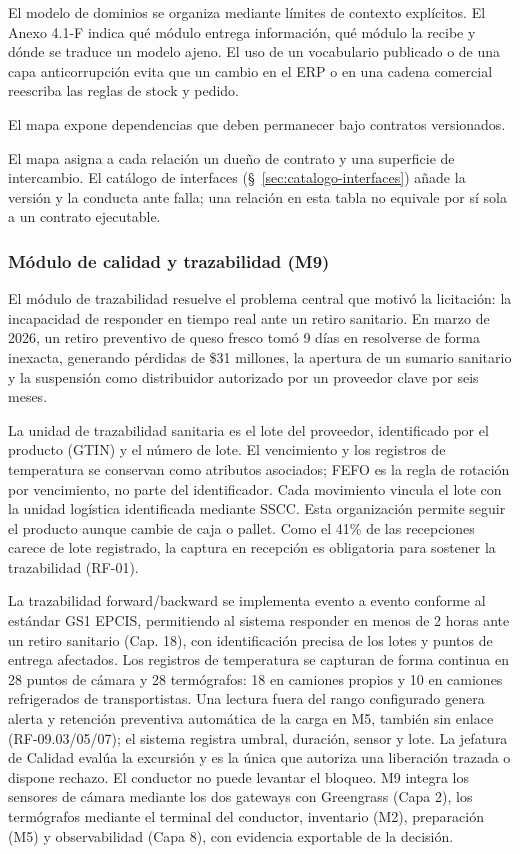 El modelo de dominios se organiza mediante límites de contexto explícitos. El Anexo 4.1-F indica qué módulo entrega información, qué módulo la recibe y dónde se traduce un modelo ajeno. El uso de un vocabulario publicado o de una capa anticorrupción evita que un cambio en el ERP o en una cadena comercial reescriba las reglas de stock y pedido.


El mapa expone dependencias que deben permanecer bajo contratos versionados.

El mapa asigna a cada relación un dueño de contrato y una superficie de intercambio. El catálogo de interfaces (\S~\ref{sec:catalogo-interfaces}) añade la versión y la conducta ante falla; una relación en esta tabla no equivale por sí sola a un contrato ejecutable.

\subsubsection{Módulo de calidad y trazabilidad (M9)}

El módulo de trazabilidad resuelve el problema central que motivó la licitación: la incapacidad de responder en tiempo real ante un retiro sanitario. En marzo de 2026, un retiro preventivo de queso fresco tomó 9 días en resolverse de forma inexacta, generando pérdidas de \$31 millones, la apertura de un sumario sanitario y la suspensión como distribuidor autorizado por un proveedor clave por seis meses.

La unidad de trazabilidad sanitaria es el lote del proveedor, identificado por el producto (GTIN) y el número de lote. El vencimiento y los registros de temperatura se conservan como atributos asociados; FEFO es la regla de rotación por vencimiento, no parte del identificador. Cada movimiento vincula el lote con la unidad logística identificada mediante SSCC. Esta organización permite seguir el producto aunque cambie de caja o pallet. Como el 41\% de las recepciones carece de lote registrado, la captura en recepción es obligatoria para sostener la trazabilidad (RF-01).

La trazabilidad forward/backward se implementa evento a evento conforme al estándar GS1 EPCIS, permitiendo al sistema responder en menos de 2 horas ante un retiro sanitario (Cap. 18), con identificación precisa de los lotes y puntos de entrega afectados. Los registros de temperatura se capturan de forma continua en 28 puntos de cámara y 28 termógrafos: 18 en camiones propios y 10 en camiones refrigerados de transportistas. Una lectura fuera del rango configurado genera alerta y retención preventiva automática de la carga en M5, también sin enlace (RF-09.03/05/07); el sistema registra umbral, duración, sensor y lote. La jefatura de Calidad evalúa la excursión y es la única que autoriza una liberación trazada o dispone rechazo. El conductor no puede levantar el bloqueo. M9 integra los sensores de cámara mediante los dos gateways con Greengrass (Capa 2), los termógrafos mediante el terminal del conductor, inventario (M2), preparación (M5) y observabilidad (Capa 8), con evidencia exportable de la decisión.

